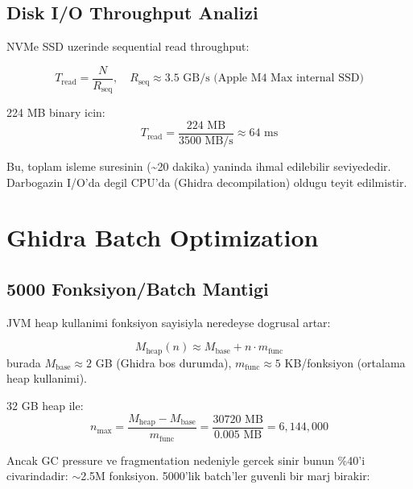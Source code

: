 \subsection{Disk I/O Throughput Analizi}

NVMe SSD uzerinde sequential read throughput:

\begin{equation}
  T_{\text{read}} = \frac{N}{R_{\text{seq}}}, \quad
  R_{\text{seq}} \approx 3.5 \text{ GB/s (Apple M4 Max internal SSD)}
  \label{eq:disk-throughput}
\end{equation}

224 MB binary icin:
\begin{equation}
  T_{\text{read}} = \frac{224 \text{ MB}}{3500 \text{ MB/s}} \approx 64 \text{ ms}
\end{equation}

Bu, toplam isleme suresinin (\textasciitilde{}20 dakika) yaninda ihmal edilebilir
seviyededir. Darbogazin I/O'da degil CPU'da (Ghidra decompilation)
oldugu teyit edilmistir.


\section{Ghidra Batch Optimization}
\label{sec:ghidra-batch}

\subsection{5000 Fonksiyon/Batch Mantigi}

JVM heap kullanimi fonksiyon sayisiyla neredeyse dogrusal artar:

\begin{equation}
  M_{\text{heap}}(n) \approx M_{\text{base}} + n \cdot m_{\text{func}}
  \label{eq:heap-usage}
\end{equation}
burada $M_{\text{base}} \approx 2$ GB (Ghidra bos durumda),
$m_{\text{func}} \approx 5$ KB/fonksiyon (ortalama heap kullanimi).

32 GB heap ile:
\begin{equation}
  n_{\max} = \frac{M_{\text{heap}} - M_{\text{base}}}{m_{\text{func}}}
           = \frac{30720 \text{ MB}}{0.005 \text{ MB}}
           = 6{,}144{,}000
\end{equation}

Ancak GC pressure ve fragmentation nedeniyle gercek sinir bunun
\%40'i civarindadir: $\sim$2.5M fonksiyon. 5000'lik batch'ler
guvenli bir marj birakir:

